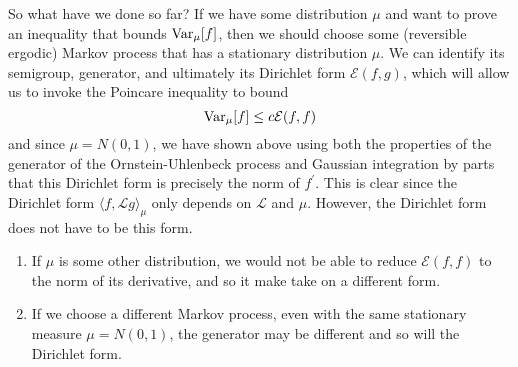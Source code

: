   So what have we done so far? If we have some distribution $\mu$ and want to prove an inequality that bounds $\operatorname{Var}_\mu [f]$, then we should choose some (reversible ergodic) Markov process that has a stationary distribution $\mu$. We can identify its semigroup, generator, and ultimately its Dirichlet form $\mathcal{E}(f, g)$, which will allow us to invoke the Poincare inequality to bound 
  \[\operatorname{Var}_\mu [f] \leq c \mathcal{E}(f, f)\]
  and since $\mu = N(0, 1)$, we have shown above using both the properties of the generator of the Ornstein-Uhlenbeck process and Gaussian integration by parts that this Dirichlet form is precisely the norm of $f^\prime$. This is clear since the Dirichlet form $\langle f, \mathscr{L} g\rangle_\mu$ only depends on $\mathscr{L}$ and $\mu$. However, the Dirichlet form does not have to be this form. 
  \begin{enumerate}
      \item If $\mu$ is some other distribution, we would not be able to reduce $\mathcal{E}(f, f)$ to the norm of its derivative, and so it make take on a different form. 
      \item If we choose a different Markov process, even with the same stationary measure $\mu = N(0, 1)$, the generator may be different and so will the Dirichlet form. 
  \end{enumerate}


